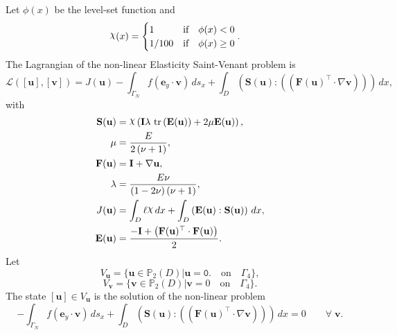 \documentclass[preview]{standalone}
\let\oldcdot\cdot
\let\cdot\oldcdot
\begin{document}
Let $\phi(x)$ be the level-set function and
 \begin{align*}\raisebox{\depth}{$\chi$}(x) &= \begin{cases} 1 & \mbox{if}\quad \phi(x) < 0 \\ 1/100 & \mbox{if}\quad \phi(x)  \ge 0 \end{cases}.\end{align*}
The Lagrangian of the non-linear Elasticity Saint-Venant problem is
\begin{dmath*}
\mathcal L(\left[ {\mathbf{ u }}\right],\left[ {\mathbf{ v }}\right]) = J({\mathbf{ u }}) -  \int_{\Gamma_N} f \left( \mathbf e_y \cdot {\mathbf{ v }} \right) \,ds_x +  \int_{D} \left( \mathbf S({\mathbf{ u }}) \mathrel{:} \left( \left(  \mathbf F({\mathbf{ u }})^\top  \cdot  \nabla {\mathbf{ v }}  \right) \right)\right) \,dx , 
\end{dmath*}
with 
\begin{align*}
\mathbf S({\mathbf{ u }}) &= \raisebox{\depth}{$\chi$} \left(\mathbf{I} \lambda  \,\operatorname{tr}\left(\mathbf E({\mathbf{ u }})\right)  + 2 \mu \mathbf E({\mathbf{ u }})\right),\\
\mu &= \frac{E}{2 \left(\nu + 1\right)},\\
\mathbf F({\mathbf{ u }}) &= \mathbf{I} +  \nabla {\mathbf{ u }} ,\\
\lambda &= \frac{E \nu}{\left(1 - 2 \nu\right) \left(\nu + 1\right)},\\
J({\mathbf{ u }}) &=  \int_{D} \ell \raisebox{\depth}{$\chi$} \,dx +  \int_{D} \left( \mathbf E({\mathbf{ u }}) \mathrel{:} \mathbf S({\mathbf{ u }}) \right) \,dx,\\
\mathbf E({\mathbf{ u }}) &= \frac{- \mathbf{I} + \left(  \mathbf F({\mathbf{ u }})^\top  \cdot \mathbf F({\mathbf{ u }}) \right)}{2}.
 \end{align*}
Let
\begin{equation*}
V_{{\mathbf{ u }}} = \{ {\mathbf{ u }} \in \mathbb P_{2}(D)| {\mathbf{ u }} = \mathtt{\text{0.}}  \quad \text{{on}} \quad\Gamma_{4} \},\end{equation*}
\begin{equation*}
V_{{\mathbf{ v }}} = \{ {\mathbf{ v }} \in \mathbb P_{2}(D)| {\mathbf{ v }} = 0  \quad \text{{on}} \quad\Gamma_{4} \}.\end{equation*}
The state $\left[ {\mathbf{ u }}\right] \in  V_{{\mathbf{ u }}}$ is the solution of the non-linear problem
\begin{dmath*}
-  \int_{\Gamma_N} f \left( \mathbf e_y \cdot {\mathbf{ v }} \right) \,ds_x +  \int_{D} \left( \mathbf S({\mathbf{ u }}) \mathrel{:} \left( \left(  \mathbf F({\mathbf{ u }})^\top  \cdot  \nabla {\mathbf{ v }}  \right) \right)\right) \,dx = 0\qquad \forall\; {\mathbf{ v }} . 
\end{dmath*}
\end{document}

